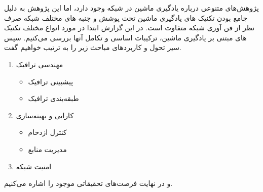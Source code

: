 پژوهش‌های متنوعی درباره یادگیری ماشین در شبکه
وجود دارد، اما این پژوهش به دلیل جامع بودن تکنیک های یادگیری ماشین تحت پوشش و جنبه های مختلف شبکه صرف نظر از فن آوری شبکه متفاوت است. در این گزارش ابتدا در مورد انواع مختلف تکنیک های مبتنی بر یادگیری ماشین، ترکیبات اساسی و تکامل آنها بررسی می‌کنیم. سپس سیر تحول و کاربردهای مباحث زیر را به ترتیب خواهیم گفت.
\begin{enumerate}
    \item مهندسی ترافیک
    \begin{itemize}
        \item پیشبینی ترافیک
        \item طبقه‌بندی ترافیک
    \end{itemize}
    \item کارایی و بهینه‌سازی
    \begin{itemize}
        \item کنترل ازدحام
        \item مدیریت منابع
    \end{itemize}
    \item امنیت شبکه
\end{enumerate}
و در نهایت فرصت‌های تحقیقاتی موجود را اشاره می‌کنیم.


